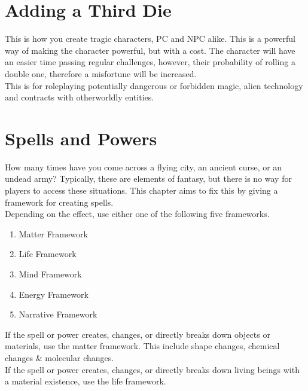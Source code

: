 \documentclass{LegrandOrangeTufteBook}
\newcommand{\term}[1]{\textcolor{colorTerm}{#1}}
\begin{document}


\section*{Adding a Third Die}

This is how you create tragic characters, PC and NPC alike.
This is a powerful way of making the character powerful, but with a cost.
The character will have an easier time passing regular challenges,
however, their probability of rolling a double one, therefore a \term{misfortune}
will be increased.\\

This is for roleplaying potentially dangerous or forbidden magic, alien technology and contracts with otherworldly entities.

\section*{Spells and Powers}

How many times have you come across a flying city, an ancient curse, or an
undead army? Typically, these are elements of fantasy, but there is no
way for players to access these situations. This chapter aims to fix
this by giving a framework for creating spells.\\

Depending on the effect, use either one of the following five frameworks.
\begin{enumerate}
	\item Matter Framework
	\item Life Framework
	\item Mind Framework
	\item Energy Framework
	\item Narrative Framework
\end{enumerate}

If the spell or power creates, changes, or directly breaks down objects or materials, use the matter framework.
This include shape changes, chemical changes \& molecular changes.\\

If the spell or power creates, changes, or directly breaks down living beings with a material existence, use the life framework.\\
\end{document}
